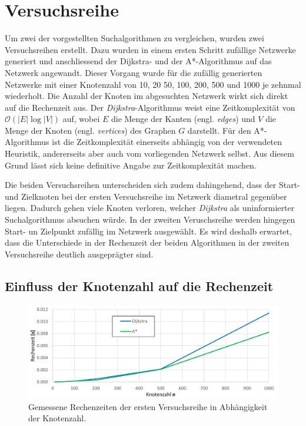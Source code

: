 \section{Versuchsreihe}
\label{section:verkehr/versuchsreihe}

Um zwei der vorgestellten Suchalgorithmen zu vergleichen, wurden zwei Versuchsreihen erstellt. Dazu wurden in einem ersten Schritt zufällige Netzwerke generiert und anschliessend der Dijkstra- und der A*-Algorithmus auf das Netzwerk angewandt.
Dieser Vorgang wurde für die zufällig generierten Netzwerke mit einer Knotenzahl von 10, 20 50, 100, 200, 500 und 1000 je zehnmal wiederholt.
Die Anzahl der Knoten im abgesuchten Netzwerk wirkt sich direkt auf die Rechenzeit aus. Der \emph{Dijkstra}-Algorithmus weist eine Zeitkomplexität von $\mathcal{O}(|E|\log{}|V|)$ auf, wobei $E$ die Menge der Kanten (engl. \emph{edges}) und $V$ die Menge der Knoten (engl. \emph{vertices}) des Graphen $G$ darstellt.
Für den A*-Algorithmus ist die Zeitkomplexität einerseits abhängig von der verwendeten Heuristik, andererseits aber auch vom vorliegenden Netzwerk selbst. Aus diesem Grund lässt sich keine definitive Angabe zur Zeitkomplexität machen.

Die beiden Versuchsreihen unterscheiden sich zudem dahingehend, dass der Start- und Zielknoten bei der ersten Versuchsreihe im Netzwerk diametral gegenüber liegen. Dadurch gehen viele Knoten verloren, welcher \emph{Dijkstra} als uninformierter Suchalgorithmus absuchen würde. In der zweiten Veruschsreihe werden hingegen Start- un Zielpunkt zufällig im Netzwerk ausgewählt. Es wird deshalb erwartet, dass die Unterschiede in der Rechenzeit der beiden Algorithmen in der zweiten Versuchsreihe deutlich ausgeprägter sind.

\subsection{Einfluss der Knotenzahl auf die Rechenzeit}
\label{verkehr:Knotenzahl}

\begin{figure}
\centering
\includegraphics[width=12cm]{papers/verkehr/figures/chart_Vr1.png}

\caption{Gemessene Rechenzeiten der ersten Versuchsreihe in Abhängigkeit der Knotenzahl.}
\label{verkehr:Vr1}
\end{figure}


